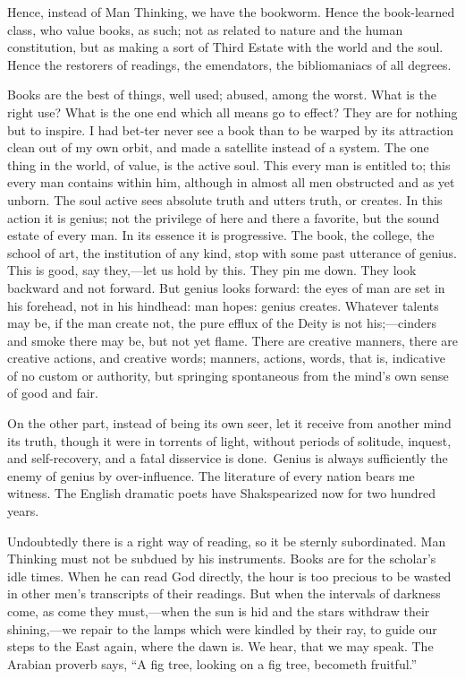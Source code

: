 Hence, instead of Man Thinking, we have the bookworm. Hence the
book-learned class, who value books, as such; not as related to nature
and the human constitution, but as making a sort of Third Estate with
the world and the soul. Hence the restorers of readings, the
emendators, the bibliomaniacs of all degrees.

Books are the best of things, well used; abused, among the worst. What
is the right use? What is the one end which all means go to effect?
They are for nothing but to inspire. I had bet-ter never see
a book than to be warped by its attraction clean out of my own orbit,
and made a satellite instead of a system. The one thing in the world,
of value, is the active soul. This every man is entitled to; this
every man contains within him, although in almost all men obstructed
and as yet unborn. The soul active sees absolute truth and utters
truth, or creates. In this action it is genius; not the privilege of
here and there a favorite, but the sound estate of every man. In its
essence it is progressive. The book, the college, the school of art,
the institution of any kind, stop with some past utterance of genius.
This is good, say they,---let us hold by this. They pin me down. They
look backward and not forward. But genius looks forward: the eyes of
man are set in his forehead, not in his hindhead: man hopes: genius
creates. Whatever talents may be, if the man create not, the pure
efflux of the Deity is not his;---cin\-ders and smoke there may be,
but not yet flame. There are creative manners, there are creative
actions, and creative words; manners, actions, words, that is,
indicative of no custom or authority, but springing spontaneous from
the mind's own sense of good and fair.

On the other part, instead of being its own  seer, let it
receive from another mind its truth, though it were in torrents of
light, without periods of solitude, inquest, and self-recovery, and a
fatal disservice is done. Genius is always sufficiently the enemy of
genius by over-influence. The literature of every nation bears me
witness. The English dramatic poets have Shakspearized now for two
hundred years.

Undoubtedly there is a right way of reading, so it be sternly
subordinated. Man Thinking must not be subdued by his instruments.
Books are for the scholar's idle times. When he can read God directly,
the hour is too precious to be wasted in other men's transcripts of
their readings. But when the intervals of darkness come, as come they
must,---when the sun is hid and the stars withdraw their
shin\-ing,---we repair to the lamps which were kindled by their ray,
to guide our steps to the East again, where the dawn is. We hear, that
we may speak. The Arabian proverb says, ``A fig tree, looking on a fig
tree, becometh fruitful.''

